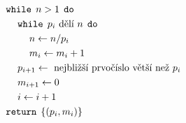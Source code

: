 \documentclass[preview]{standalone}
\begin{document}
\begin{align*}
&\mathtt{while} \:\: n > 1 \:\: \mathtt{do}\\&\hspace*{12pt}\mathtt{while} \:\: p_i \text{ dělí } n \:\: \mathtt{do}\\&\hspace*{24pt}n \leftarrow n / p_i\\&\hspace*{24pt}m_i \leftarrow m_i + 1\\&\hspace*{12pt}p_{i+1} \leftarrow \text{ nejbližší prvočíslo větší než } p_i\\&\hspace*{12pt}m_{i+1} \leftarrow 0\\&\hspace*{12pt}i \leftarrow i + 1\\&\mathtt{return} \:\: \{(p_i, m_i)\}
\end{align*}
\end{document}
